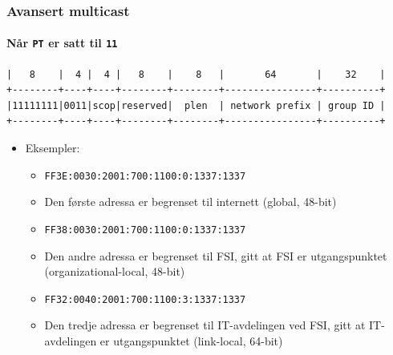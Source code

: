 \begin{frame}[fragile]%
  \frametitle{Avansert multicast}
  \framesubtitle{Når \texttt{PT} er satt til \texttt{11}}
\begin{Verbatim}[fontsize=\tiny]
|   8    |  4 |  4 |   8    |    8   |       64       |    32    |
+--------+----+----+--------+--------+----------------+----------+
|11111111|0011|scop|reserved|  plen  | network prefix | group ID |
+--------+----+----+--------+--------+----------------+----------+
\end{Verbatim}
  \begin{itemize}[<+->]
  \item Eksempler:
    \begin{itemize}[<+->]
    \item \texttt{FF3\alert<3>{E}:00\alert<3>{30}:2001:700:1100:0:1337:1337}
    \item Den første adressa er begrenset til internett (global,
      48-bit)
    \item \texttt{FF3\alert<5>{8}:00\alert<5>{30}:2001:700:1100:0:1337:1337}
    \item Den andre adressa er begrenset til FSI, gitt at FSI er
      utgangspunktet (organizational-local, 48-bit)
    \item \texttt{FF3\alert<7>{2}:00\alert<7>{40}:2001:700:1100:3:1337:1337}
    \item Den tredje adressa er begrenset til IT-avdelingen ved FSI,
      gitt at IT-avdelingen er utgangspunktet (link-local, 64-bit)
    \end{itemize}
  \end{itemize}
\end{frame}

